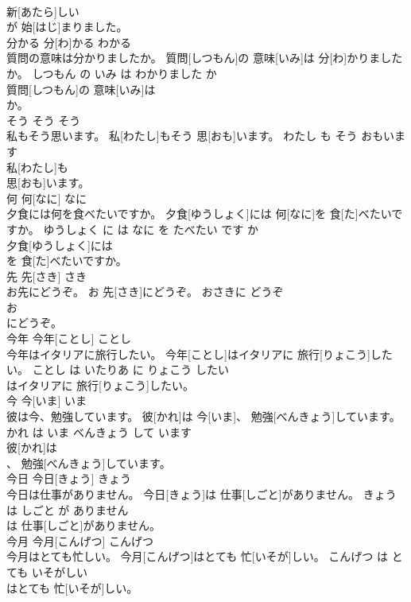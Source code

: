 \documentclass[8pt]{extreport}
\begin{document}
\begin{CJK}{UTF8}{min}
\\	新[あたら]しい
\\	が 始[はじ]まりました。			
\\	分かる	分[わ]かる	わかる	
\\	質問の意味は分かりましたか。	質問[しつもん]の 意味[いみ]は 分[わ]かりましたか。	しつもん の いみ は わかりました か	
\\	質問[しつもん]の 意味[いみ]は
\\	か。			
\\	そう	そう	そう	
\\	私もそう思います。	私[わたし]もそう 思[おも]います。	わたし も そう おもいます	
\\	私[わたし]も
\\	思[おも]います。			
\\	何	何[なに]	なに	
\\	夕食には何を食べたいですか。	夕食[ゆうしょく]には 何[なに]を 食[た]べたいですか。	ゆうしょく に は なに を たべたい です か	
\\	夕食[ゆうしょく]には
\\	を 食[た]べたいですか。			
\\	先	先[さき]	さき	
\\	お先にどうぞ。	お 先[さき]にどうぞ。	おさきに どうぞ	
\\	お
\\	にどうぞ。			
\\	今年	今年[ことし]	ことし	
\\	今年はイタリアに旅行したい。	今年[ことし]はイタリアに 旅行[りょこう]したい。	ことし は いたりあ に りょこう したい	
\\	はイタリアに 旅行[りょこう]したい。			
\\	今	今[いま]	いま	
\\	彼は今、勉強しています。	彼[かれ]は 今[いま]、 勉強[べんきょう]しています。	かれ は いま べんきょう して います	
\\	彼[かれ]は
\\	、 勉強[べんきょう]しています。			
\\	今日	今日[きょう]	きょう	
\\	今日は仕事がありません。	今日[きょう]は 仕事[しごと]がありません。	きょう は しごと が ありません	
\\	は 仕事[しごと]がありません。			
\\	今月	今月[こんげつ]	こんげつ	
\\	今月はとても忙しい。	今月[こんげつ]はとても 忙[いそが]しい。	こんげつ は とても いそがしい	
\\	はとても 忙[いそが]しい。			

\end{CJK}
\end{document}
